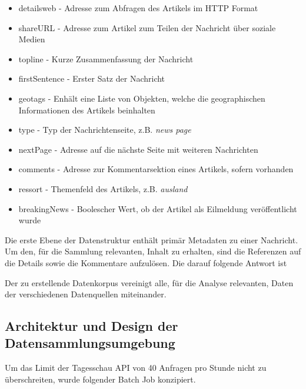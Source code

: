 \begin{itemize}
    \item detailsweb -  Adresse zum Abfragen des Artikels im HTTP Format
    \item shareURL  -  Adresse zum Artikel zum Teilen der Nachricht über soziale Medien
    \item topline  - Kurze Zusammenfassung der Nachricht
    \item firstSentence  - Erster Satz der Nachricht
    \item geotags - Enhält eine Liste von Objekten, welche die geographischen Informationen des Artikels beinhalten
    \item type - Typ der Nachrichtenseite, z.B. \textit{news page}
    \item nextPage - Adresse auf die nächste Seite mit weiteren Nachrichten
    \item comments - Adresse zur Kommentarsektion eines Artikels, sofern vorhanden
    \item ressort - Themenfeld des Artikels, z.B. \textit{ausland}
    \item breakingNews - Boolescher Wert, ob der Artikel als Eilmeldung veröffentlicht wurde
\end{itemize}

Die erste Ebene der Datenstruktur enthält primär Metadaten zu einer Nachricht. Um den, für die Sammlung relevanten, Inhalt zu erhalten, sind die Referenzen auf die Details sowie die Kommentare aufzulösen. 
Die darauf folgende Antwort ist 


Der zu erstellende Datenkorpus vereinigt alle, für die Analyse relevanten, Daten der verschiedenen Datenquellen miteinander.

\newpage
\subsection{Architektur und Design der Datensammlungsumgebung}

Um das Limit der Tagesschau API von 40 Anfragen pro Stunde nicht zu überschreiten, wurde folgender Batch Job konzipiert. 

